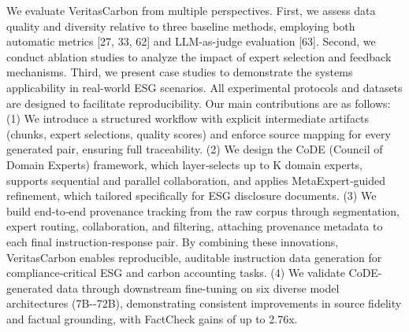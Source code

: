 \documentclass[9pt,twocolumn]{extarticle}
\begin{document}
We evaluate VeritasCarbon from multiple perspectives. First, we assess
data quality and diversity relative to three baseline methods, employing
both automatic metrics [27, 33, 62] and LLM-as-judge evaluation
[63]. Second, we conduct ablation studies to analyze the impact of
expert selection and feedback mechanisms. Third, we present case studies
to demonstrate the system\textquotesingle s applicability in real-world
ESG scenarios. All experimental protocols and datasets are designed to
facilitate reproducibility.
Our main contributions are as follows:
(1) We introduce a structured workflow with explicit intermediate
artifacts (chunks, expert selections, quality scores) and enforce source
mapping for every generated pair, ensuring full traceability.
(2) We design the CoDE (Council of Domain Experts) framework, which
layer‑selects up to K domain experts, supports sequential and parallel
collaboration, and applies MetaExpert‑guided refinement, which tailored
specifically for ESG disclosure documents.
(3) We build end‑to‑end provenance tracking from the raw corpus through
segmentation, expert routing, collaboration, and filtering, attaching
provenance metadata to each final instruction‑response pair. By
combining these innovations, VeritasCarbon enables reproducible,
auditable instruction data generation for compliance‑critical ESG and
carbon accounting tasks.
(4) We validate CoDE-generated data through downstream fine-tuning on
six diverse model architectures (7B-\/-72B), demonstrating consistent
improvements in source fidelity and factual grounding, with FactCheck
gains of up to 2.76x.
\end{document}
